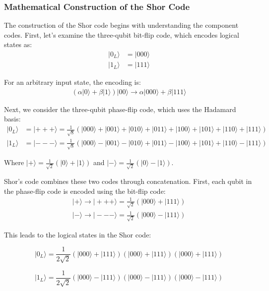 \documentclass[12pt,a4paper]{article}
\begin{document}
\subsubsection{Mathematical Construction of the Shor Code}

The construction of the Shor code begins with understanding the component codes. First, let's examine the three-qubit bit-flip code, which encodes logical states as:
\begin{align}
|0_L\rangle &= |000\rangle \\
|1_L\rangle &= |111\rangle
\end{align}

For an arbitrary input state, the encoding is:
\begin{align}
(\alpha|0\rangle + \beta|1\rangle)|00\rangle \rightarrow \alpha|000\rangle + \beta|111\rangle
\end{align}

Next, we consider the three-qubit phase-flip code, which uses the Hadamard basis:
\begin{align}
|0_L\rangle &= |{+}{+}{+}\rangle = \frac{1}{\sqrt{8}}(|000\rangle + |001\rangle + |010\rangle + |011\rangle + |100\rangle + |101\rangle + |110\rangle + |111\rangle) \\
|1_L\rangle &= |{-}{-}{-}\rangle = \frac{1}{\sqrt{8}}(|000\rangle - |001\rangle - |010\rangle + |011\rangle - |100\rangle + |101\rangle + |110\rangle - |111\rangle)
\end{align}

Where $|+\rangle = \frac{1}{\sqrt{2}}(|0\rangle + |1\rangle)$ and $|-\rangle = \frac{1}{\sqrt{2}}(|0\rangle - |1\rangle)$.

Shor's code combines these two codes through concatenation. First, each qubit in the phase-flip code is encoded using the bit-flip code:
\begin{align}
|+\rangle \rightarrow |{+}{+}{+}\rangle = \frac{1}{\sqrt{2}}(|000\rangle + |111\rangle) \\
|-\rangle \rightarrow |{-}{-}{-}\rangle = \frac{1}{\sqrt{2}}(|000\rangle - |111\rangle)
\end{align}

This leads to the logical states in the Shor code:

\begin{equation}
    |0_L\rangle = \frac{1}{2\sqrt{2}}(|000\rangle + |111\rangle)(|000\rangle + |111\rangle)(|000\rangle + |111\rangle)
\end{equation}

\begin{equation}
    |1_L\rangle = \frac{1}{2\sqrt{2}}(|000\rangle - |111\rangle)(|000\rangle - |111\rangle)(|000\rangle - |111\rangle)
\end{equation}
\end{document}
